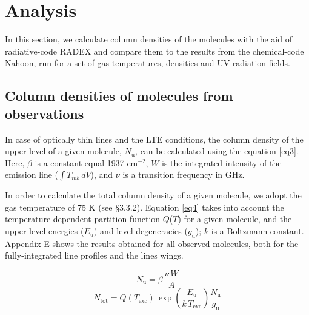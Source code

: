 \documentclass{aa}
\begin{document}
\section{Analysis}
In this section, we calculate column densities of the molecules with the aid 
of radiative-code RADEX and compare them to the results from the chemical-code Nahoon, 
run for a set of gas temperatures, densities and UV radiation fields. 
\subsection{Column densities of molecules from observations}

In case of optically thin lines and the LTE conditions, the column density of the 
upper level of a given molecule, $N_\mathrm{u}$, can be calculated using the equation \ref{eq3}. 
Here, $\beta$ is a constant equal 1937 cm$^{-2}$, $W$ is the integrated
intensity of the emission line ($\int{T_{mb} \, dV}$), and $\nu$ is a transition 
frequency in GHz. 

In order to calculate the total column density of a given molecule, 
we adopt the gas temperature of 75 K (see \S 3.3.2). Equation \ref{eq4} takes into account the 
temperature-dependent partition function $Q$($T$) for a given molecule, and 
the upper level energies ($E_\mathrm{u}$) and level degeneracies ($g_\mathrm{u}$);
$k$ is a Boltzmann constant. Appendix E shows the results obtained for all observed 
molecules, both for the fully-integrated line profiles and the lines wings.


\begin{equation} 
\label{eq3} N_\mathrm{u} = \beta \, \frac{\nu \,W}{A} 
\end{equation} 
\begin{equation} 
\label{eq4} N_\mathrm{tot} = Q(T_\mathrm{exc}) \, \exp(\frac{E_\mathrm{u}}{k \, T_\mathrm{exc}})  \frac{N_\mathrm{u} }{g_\mathrm{u} } 
\end{equation} 
\end{document}
